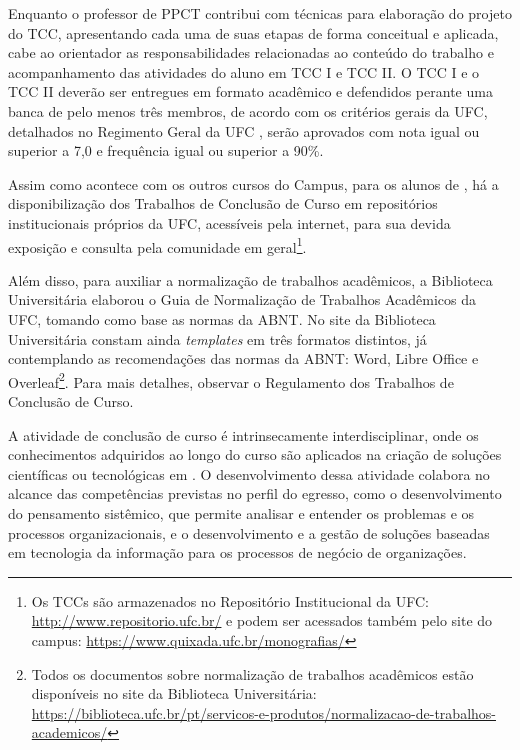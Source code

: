 Enquanto o professor de PPCT contribui com técnicas para elaboração do projeto do TCC, apresentando cada uma de suas etapas de forma conceitual e aplicada, cabe ao orientador as responsabilidades relacionadas ao conteúdo do trabalho e acompanhamento das atividades do aluno em TCC I e TCC II. O TCC I e o TCC II deverão ser entregues em formato acadêmico e defendidos perante uma banca de pelo menos três membros, de acordo com os critérios gerais da UFC, detalhados no Regimento Geral da UFC \cite{ufc_regimento_geral_2019}, serão aprovados com nota igual ou superior a 7,0 e frequência igual ou superior a 90\%.

Assim como acontece com os outros cursos do Campus, para os alunos de \nomedocurso, há a disponibilização dos Trabalhos de Conclusão de Curso em repositórios institucionais próprios da UFC, acessíveis pela internet, para sua devida exposição e consulta pela comunidade em geral\footnote{Os TCCs são armazenados no Repositório Institucional da UFC: \url{http://www.repositorio.ufc.br/} e podem ser acessados também pelo site do campus: \url{https://www.quixada.ufc.br/monografias/}}.

Além disso, para auxiliar a normalização de trabalhos acadêmicos, a Biblioteca Universitária elaborou o Guia de Normalização de Trabalhos Acadêmicos da UFC, tomando como base as normas da ABNT. No site da Biblioteca Universitária constam ainda \textit{templates} em três formatos distintos, já contemplando as recomendações das normas da ABNT: Word, Libre Office e Overleaf\footnote{Todos os documentos sobre normalização de trabalhos acadêmicos estão disponíveis no site da Biblioteca Universitária: \url{https://biblioteca.ufc.br/pt/servicos-e-produtos/normalizacao-de-trabalhos-academicos/}}. Para mais detalhes, observar o Regulamento dos Trabalhos de Conclusão de Curso.

A atividade de conclusão de curso é  intrinsecamente interdisciplinar, onde os conhecimentos adquiridos ao longo do curso são aplicados na criação de soluções científicas ou tecnológicas em \nomedocurso. O desenvolvimento dessa atividade colabora  no alcance das competências previstas no perfil do egresso, como o desenvolvimento do pensamento sistêmico, que permite analisar e entender os problemas e os processos organizacionais, e o desenvolvimento e a gestão de soluções baseadas em tecnologia da informação para os processos de negócio de organizações.